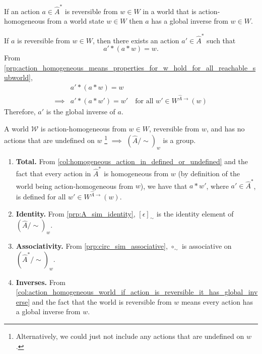 \begin{corollaryE}
\label{col:action_homogeneous_world_if_action_is_reversible_it_has_global_inverse}
    If an action $a \in \hat{A}^{*}$ is reversible from $w \in W$ in a world that is action-homogeneous from a world state $w \in W$ then $a$ has a global inverse from $w \in W$.
\end{corollaryE}
\begin{proofE}
    If $a$ is reversible from $w \in W$, then there exists an action $a' \in \hat{A}^{*}$ such that
    \begin{equation}
        a' \ast (a \ast w) = w.
    \end{equation}
    From \cref{prp:action_homogeneous_means_properties_for_w_hold_for_all_reachable_subworld},
    \begin{align}
        & a' \ast (a \ast w) = w \\
        \implies & a' \ast (a \ast w') = w' \quad \text{for all $w' \in W^{\hat{A}\to}(w)$}
    \end{align}
    Therefore, $a'$ is the global inverse of $a$.
\end{proofE}

\begin{propositionE}
    A world $\mathscr{W}$ is action-homogeneous from $w \in W$, reversible from $w$, and has no actions that are undefined on $w$ \footnote{
    Alternatively, we could just not include any actions that are undefined on $w$.
    }  $\implies$ $(\hat{A}/\sim)_{w}$ is a group.
\end{propositionE}
\begin{proofE}
\begin{enumerate}
    \item \textbf{Total.}
    From \cref{col:homogeneous_action_in_defined_or_undefined} and the fact that every action in $\hat{A}^{*}$ is homogeneous from $w$ (by definition of the world being action-homogeneous from $w$), we have that $a \ast w'$, where $a' \in \hat{A}^{*}$, is defined for all $w' \in W^{\hat{A}\to}(w)$.

    \item \textbf{Identity.}
    From \cref{prp:A_sim_identity}, $[\epsilon]_{\sim}$ is the identity element of $(\hat{A}/\sim)_{w}$.

    \item \textbf{Associativity.}
    From \cref{prp:circ_sim_associative}, $\circ_{\sim}$ is associative on $(\hat{A}^{*}/\sim)_{w}$.

    \item \textbf{Inverses.}
    From \cref{col:action_homogeneous_world_if_action_is_reversible_it_has_global_inverse} and the fact that the world is reversible from $w$ means every action has a global inverse from $w$.
\end{enumerate}
\end{proofE}

